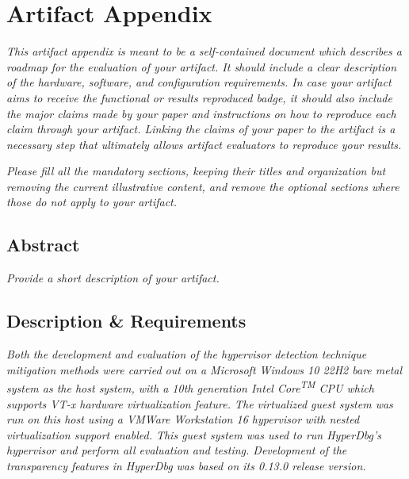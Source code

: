 
\section{Artifact Appendix}
\textit{This artifact appendix is meant to be a self-contained document which
describes a roadmap for the evaluation of your artifact. It should include a
clear description of the hardware, software, and configuration requirements. In
case your artifact aims to receive the functional or results reproduced badge,
it should also include the major claims made by your paper and instructions on
how to reproduce each claim through your artifact. Linking the claims of your
paper to the artifact is a necessary step that ultimately allows artifact
evaluators to reproduce your results.}

\textit{Please fill all the mandatory sections, keeping their titles and
organization but removing the current illustrative content, and remove the
optional sections where those do not apply to your artifact.}

\subsection{Abstract}
{\em Provide a short description of your artifact.}

\subsection{Description \& Requirements}

\textit{Both the development and evaluation of the hypervisor detection technique mitigation methods were carried out
on a Microsoft Windows 10 22H2 bare metal system as the host system, with a 10th generation Intel Core\textsuperscript{TM} CPU which supports VT-x hardware virtualization feature.
The virtualized guest system was run on this host using a VMWare Workstation 16 hypervisor with nested virtualization support enabled.
This guest system was used to run HyperDbg's hypervisor and perform all evaluation and testing. Development of the transparency features in HyperDbg was based on its 0.13.0 release version. }

